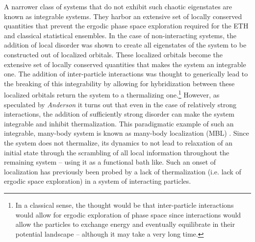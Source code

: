 A narrower class of systems that do not exhibit such chaotic eigenstates are known as integrable systems. They harbor an extensive set of locally conserved quantities that prevent the ergodic phase space exploration required for the ETH and classical statistical ensembles\cite{DAlessio2016}. In the case of non-interacting systems, the addition of local disorder was shown to create all eigenstates of the system to be constructed out of localized orbitals\cite{Anderson1958,Schwartz2007,Billy2008,Roati2008,Lahini2008,Deissler2010,Gadway2011,Kondov2011,Jendrzejewski2012,DErrico2008}. These localized orbitals become the extensive set of locally conserved quantities that makes the system an integrable one. The addition of inter-particle interactions was thought to generically lead to the breaking of this integrability by allowing for hybridization between these localized orbitals return the system to a thermalizing one.\footnote{In a classical sense, the thought would be that inter-particle interactions would allow for ergodic exploration of phase space since interactions would allow the particles to exchange energy and eventually equilibrate in their potential landscape -- although it may take a very long time.} However, as speculated by \emph{Anderson}\cite{Anderson1958} it turns out that even in the case of relatively strong interactions, the addition of sufficiently strong disorder can make the system integrable and inhibit thermalization. This paradigmatic example of such an integrable, many-body system is known as many-body localization (MBL) \cite{Nandkishore2015,Anderson1958,Kondov2015,Semeghini2015,Gornyi2005,Basko2006,Oganesyan2007,Vosk2015}. Since the system does not thermalize, its dynamics to not lead to relaxation of an initial state through the scrambling of all local information throughout the remaining system -- using it as a functional bath like. Such an onset of localization has previously been probed by a lack of thermalization (i.e. lack of ergodic space exploration) in a system of interacting particles\cite{Schreiber2015,Smith2016,Choi2016}.

